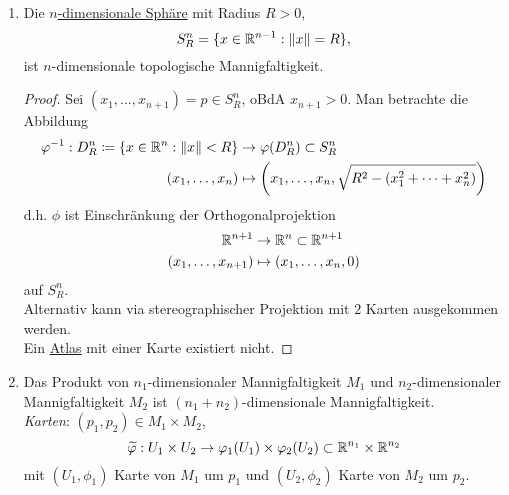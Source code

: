\begin{example}
\begin{enumerate}
    \item Die \hyperref[bsp:einheitssphaere]{$ n $-dimensionale Sphäre} mit Radius $ R > 0 $,
    \begin{equation*}
      S^n_R = \{ x \in \mathbb{R}^{n-1} : \Vert x \Vert = R \}\text{,}
    \end{equation*}
    ist $ n $-dimensionale topologische Mannigfaltigkeit.
    \begin{proof}
      Sei $ (x_1, \dots, x_{n+1}) = p \in S^n_R $, oBdA $ x_{n+1} > 0 $. Man betrachte die Abbildung
      \begin{align*}
        \varphi^{-1} : D^n_R \coloneqq \left\{ x \in \mathbb{R}^n : \Vert x \Vert < R \right\} &\to \varphi(D^n_R) \subset S^n_R \\
          (x_1, \dots, x_n) &\mapsto \left(x_1, \dots, x_n, \sqrt{R^2-(x_1^2 + \cdots + x_n^2)}\right)
      \end{align*}
      d.h. $ \phi $ ist Einschränkung der Orthogonalprojektion
      \begin{align*}
        \mathbb{R}^{n+1} &\to \mathbb{R}^n \subset \mathbb{R}^{n+1} \\
          (x_1, \dots, x_{n+1}) &\mapsto (x_1, \dots, x_n, 0)
      \end{align*}
      auf $ S_R^n $. \\
      Alternativ kann via stereographischer Projektion mit $ 2 $ Karten ausgekommen werden. \\
      Ein \hyperref[def:atlas]{Atlas} mit einer Karte existiert nicht.
    \end{proof}
    \item Das Produkt von $ n_1 $-dimensionaler Mannigfaltigkeit $ M_1 $ und $ n_2 $-dimensionaler Mannigfaltigkeit $ M_2 $ ist $ (n_1+n_2) $-dimensionale Mannigfaltigkeit. \\
    \emph{Karten}: $ (p_1, p_2) \in M_1 \times M_2 $,
    \begin{equation*}
      \widetilde{\varphi} : U_1 \times U_2 \to \varphi_1(U_1) \times \varphi_2(U_2) \subset \mathbb{R}^{n_1} \times \mathbb{R}^{n_2}
    \end{equation*}
    mit $ (U_1, \phi_1) $ Karte von $ M_1 $ um $ p_1 $ und $ (U_2, \phi_2) $ Karte von $ M_2 $ um $ p_2 $.
  \end{enumerate}
\end{example}

